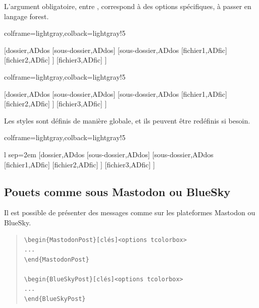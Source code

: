 \documentclass[11pt,a4paper]{ltxdoc}
\begin{document}
L'argument obligatoire, entre , correspond à des options spécifiques, à passer en langage \textsf{forest}.

\begin{tcblisting}{colframe=lightgray,colback=lightgray!5}
\begin{ArborDossiers}{}
    [dossier,ADdos
        [sous-dossier,ADdos]
        [sous-dossier,ADdos
            [fichier1,ADfic]
            [fichier2,ADfic]
        ]
        [fichier3,ADfic]
    ]
\end{ArborDossiers}
\end{tcblisting}

\begin{tcblisting}{colframe=lightgray,colback=lightgray!5}
\begin{ArborDossiers}%
    [Police=\sffamily,CoulIcoD=yellow!50!pink,AffIcoF,CoulIcoF=teal,EspaceV=0.5em]%
    {}
    [dossier,ADdos
        [sous-dossier,ADdos]
        [sous-dossier,ADdos
            [fichier1,ADfic]
            [fichier2,ADfic]
        ]
        [fichier3,ADfic]
    ]
\end{ArborDossiers}
\end{tcblisting}

Les styles sont définis de manière globale, et ils peuvent être redéfinis si besoin.

\begin{tcblisting}{colframe=lightgray,colback=lightgray!5}
\begin{ArborDossiers}%
    [Police=\sffamily,CoulIcoD=yellow!50!pink,AffIcoF,CoulIcoF=teal,EspaceV=0.5em]%
    {l sep=2em}
    [dossier,ADdos
        [sous-dossier,ADdos]
        [sous-dossier,ADdos
            [fichier1,ADfic]
            [fichier2,ADfic]
        ]
        [fichier3,ADfic]
    ]
\end{ArborDossiers}
\end{tcblisting}

\pagebreak

\subsection{Pouets comme sous Mastodon ou BlueSky}

Il est possible de présenter des messages comme sur les plateformes Mastodon ou BlueSky.

\begin{quote}
\begin{verbatim}
\begin{MastodonPost}[clés]<options tcolorbox>
...
\end{MastodonPost}

\begin{BlueSkyPost}[clés]<options tcolorbox>
...
\end{BlueSkyPost}
\end{verbatim}
\end{quote}
\end{document}
